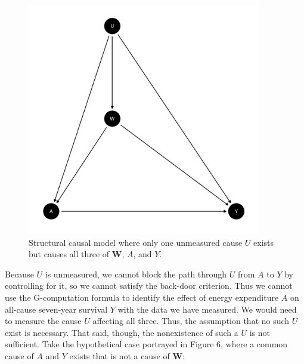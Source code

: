 \documentclass{article}\usepackage[]{graphicx}\usepackage[]{xcolor}
\newenvironment{knitrout}{}{} %
\begin{document}
\begin{figure}[H]
  \caption{Structural causal model where only one unmeasured cause $U$ exists but causes all three of $\bm{W}$, $A$, and $Y$.}
      
\begin{knitrout}
\color{fgcolor}
\includegraphics[width=4in]{figure/unnamed-chunk-6-1} 

\end{knitrout}

\end{figure}

Because $U$ is unmeasured, we cannot block the path through $U$ from $A$ to $Y$ by controlling for it, so we cannot satisfy the back-door criterion. Thus we cannot use the G-computation formula to identify the effect of energy expenditure $A$ on all-cause seven-year survival $Y$ with the data we have measured. We would need to measure the cause $U$ affecting all three. Thus, the assumption that no such $U$ exist is necessary. That said, though, the nonexistence of such a $U$ is not sufficient. Take the hypothetical case portrayed in Figure 6, where a common cause of $A$ and $Y$ exists that is not a cause of $\bm{W}$:
\end{document}
